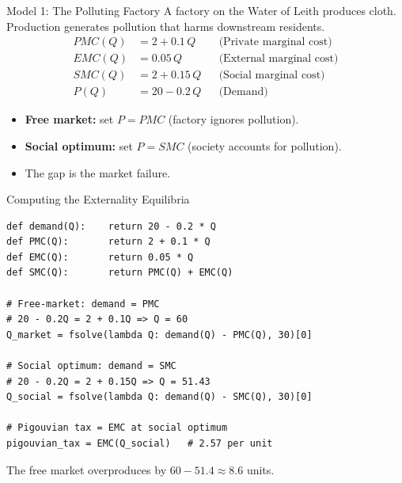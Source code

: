 \documentclass[aspectratio=169, 10pt]{beamer}
\begin{document}
\begin{frame}{Model 1: The Polluting Factory}
A factory on the Water of Leith produces cloth. Production generates
pollution that harms downstream residents.
\vspace{0.5em}
\begin{align*}
  PMC(Q) &= 2 + 0.1\,Q & &\text{(Private marginal cost)} \\[4pt]
  EMC(Q) &= 0.05\,Q & &\text{(External marginal cost)} \\[4pt]
  SMC(Q) &= 2 + 0.15\,Q & &\text{(Social marginal cost)} \\[4pt]
  P(Q) &= 20 - 0.2\,Q & &\text{(Demand)}
\end{align*}
\vspace{0.3em}
\begin{itemize}
  \item \textbf{Free market:} set $P = PMC$ (factory ignores pollution).
  \item \textbf{Social optimum:} set $P = SMC$ (society accounts for pollution).
  \item The gap is the market failure.
\end{itemize}
\end{frame}

\begin{frame}[fragile]{Computing the Externality Equilibria}
\begin{lstlisting}
def demand(Q):    return 20 - 0.2 * Q
def PMC(Q):       return 2 + 0.1 * Q
def EMC(Q):       return 0.05 * Q
def SMC(Q):       return PMC(Q) + EMC(Q)

# Free-market: demand = PMC
# 20 - 0.2Q = 2 + 0.1Q => Q = 60
Q_market = fsolve(lambda Q: demand(Q) - PMC(Q), 30)[0]

# Social optimum: demand = SMC
# 20 - 0.2Q = 2 + 0.15Q => Q = 51.43
Q_social = fsolve(lambda Q: demand(Q) - SMC(Q), 30)[0]

# Pigouvian tax = EMC at social optimum
pigouvian_tax = EMC(Q_social)   # 2.57 per unit
\end{lstlisting}
\vspace{0.3em}
The free market overproduces by $60 - 51.4 \approx 8.6$ units.
\end{frame}
\end{document}
